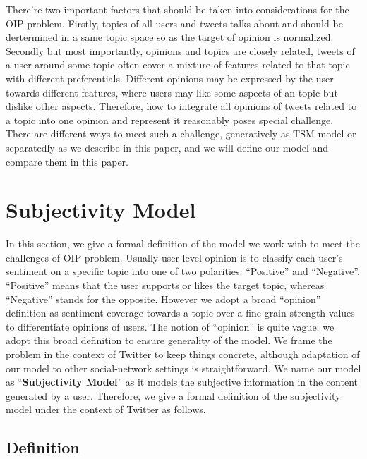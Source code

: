 \documentclass[runningheads,a4paper]{llncs}
\begin{document}
There’re two important factors that should be taken into considerations for the OIP problem. Firstly, topics of all users and tweets talks about and should be dertermined in a same topic space so as the target of opinion is normalized. Secondly but most importantly, opinions and topics are closely related, tweets of a user around some topic often cover a mixture of features related to that topic with different preferentials. Different opinions may be expressed by the user towards different features, where users may like some aspects of an topic but dislike other aspects. Therefore, how to integrate all opinions of tweets related to a topic into one opinion and represent it reasonably poses special challenge. There are different ways to meet such a challenge, generatively as TSM model or separatedly as we describe in this paper, and we will define our model and compare them in this paper. 

\section{Subjectivity Model}
\label{sec4}

In this section, we give a formal definition of the model we work with to meet the challenges of OIP problem. Usually user-level opinion is to classify each user’s sentiment on a specific topic into one of two polarities: ``Positive'' and ``Negative''. ``Positive'' means that the user supports or likes the target topic, whereas ``Negative'' stands for the opposite. However we adopt a broad ``opinion'' definition as sentiment coverage towards a topic over a fine-grain strength values to differentiate opinions of users. The notion of ``opinion'' is quite vague; we adopt this broad definition to ensure generality of the model. We frame the problem in the context of Twitter to keep things concrete, although adaptation of our model to other social-network settings is straightforward. We name our model as ``\textbf{Subjectivity Model}'' as it models the subjective information in the content generated by a user. Therefore, we give a formal definition of the subjectivity model under the context of Twitter as follows.

\subsection{Definition}
\label{definition}
\end{document}
